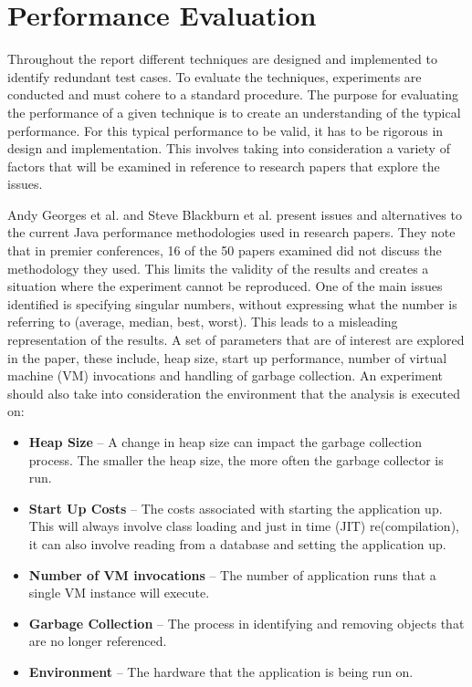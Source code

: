 \section{Performance Evaluation}
\label{performanceEvalBG}
Throughout the report different techniques are designed and implemented to identify redundant test cases. To evaluate the techniques, experiments are conducted and must cohere to a standard procedure. The purpose for evaluating the performance of a given technique is to create an understanding of the typical performance. For this typical performance to be valid, it has to be rigorous in design and implementation. This involves taking into consideration a variety of factors that will be examined in reference to research papers that explore the issues.

Andy Georges et al. \cite{georges2007statistically} and Steve Blackburn et al. \cite{blackburn2008wake} present issues and alternatives to the current Java performance methodologies used in research papers. They note that in premier conferences, 16 of the 50 papers examined did not discuss the methodology they used. This limits the validity of the results and creates a situation where the experiment cannot be reproduced. One of the main issues identified is specifying singular numbers, without expressing what the number is referring to (average, median, best, worst). This leads to a misleading representation of the results. A set of parameters that are of interest are explored in the paper, these include, heap size, start up performance, number of virtual machine (VM) invocations and handling of garbage collection. An experiment should also take into consideration the environment that the analysis is executed on:
\begin{itemize}
\item \textbf{Heap Size} -- A change in heap size can impact the garbage collection process. The smaller the heap size, the more often the garbage collector is run.
\item \textbf{Start Up Costs}  -- The costs associated with starting the application up. This will always involve class loading and just in time (JIT) re(compilation), it can also involve reading from a database and setting the application up.
\item \textbf{Number of VM invocations} -- The number of application runs that a single VM instance will execute.
\item \textbf{Garbage Collection} -- The process in identifying and removing objects that are no longer referenced.
\item \textbf{Environment} -- The hardware that the application is being run on.
\end{itemize}

